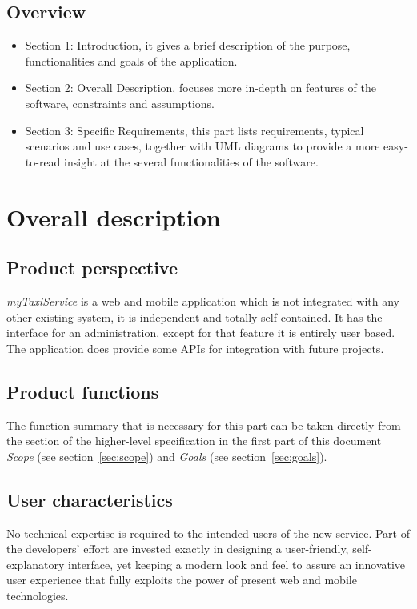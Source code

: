 \documentclass[a4paper,11pt]{report} %
\newcommand{\mts}{\mbox{\normalfont\itshape myTaxiService}}
\begin{document}
	\subsection{Overview}
		\begin{itemize}
			\item Section 1: Introduction, it gives a brief description of the purpose, functionalities and goals of the application.
			\item Section 2: Overall Description, focuses more in-depth on features of the software, constraints and assumptions.
			\item Section 3: Specific Requirements, this part lists requirements, typical scenarios	and use cases, together with UML diagrams to provide a more easy-to-read insight at the several functionalities of the software.
		\end{itemize}
	
	\pagebreak %
	
	\section{Overall description}
	
	\subsection{Product perspective} \mts{} is a web and mobile application which is not integrated with	any other existing system, it is independent and totally self-contained. It has the interface for an administration, except for that feature it is entirely user based. The application does provide some APIs for integration with future projects.
	
	\subsection{Product functions} The function summary that is necessary for this part can be taken directly from the section of the higher-level specification in the first part of this document {\em Scope} (see section~\ref{sec:scope}) and {\em Goals} (see section~\ref{sec:goals}).
	
	\subsection{User characteristics} No technical expertise is required to the intended users of the new service. Part of the developers' effort are invested exactly in designing a user-friendly, self-explanatory interface, yet keeping a modern look and feel to assure an innovative user experience that fully exploits the power of present web and mobile technologies.  
	
\end{document}
